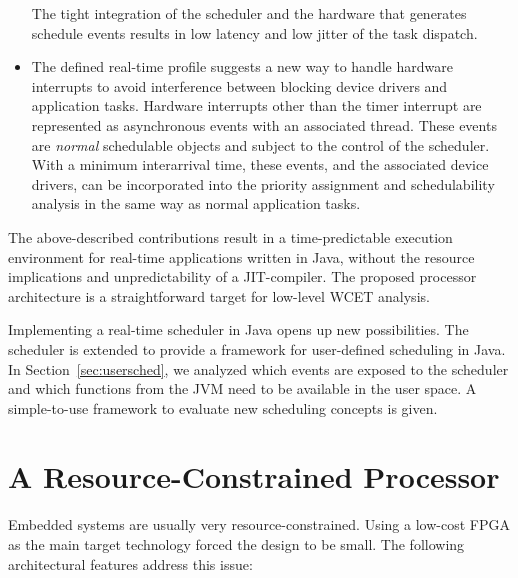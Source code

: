\begin{itemize}
The tight integration of the scheduler and the hardware that
generates schedule events results in low latency and low jitter of
the task dispatch.

    \item
%
The defined real-time profile suggests a new way to handle hardware
interrupts to avoid interference between blocking device drivers and
application tasks. Hardware interrupts other than the timer
interrupt are represented as asynchronous events with an associated
thread. These events are \emph{normal} schedulable objects and
subject to the control of the scheduler. With a minimum interarrival
time, these events, and the associated device drivers, can be
incorporated into the priority assignment and schedulability
analysis in the same way as normal application tasks.

\end{itemize}

The above-described contributions result in a time-predictable
execution environment for real-time applications written in Java,
without the resource implications and unpredictability of a
JIT-compiler. The proposed processor architecture is a
straightforward target for low-level WCET analysis.


Implementing a real-time scheduler in Java opens up new
possibilities. The scheduler is extended to provide a framework for
user-defined scheduling in Java. In Section~\ref{sec:usersched}, we
analyzed which events are exposed to the scheduler and which
functions from the JVM need to be available in the user space. A
simple-to-use framework to evaluate new scheduling concepts is
given.



\section{A Resource-Constrained Processor}

Embedded systems are usually very resource-constrained. Using a
low-cost FPGA as the main target technology forced the design to be
small. The following architectural features address this issue:

